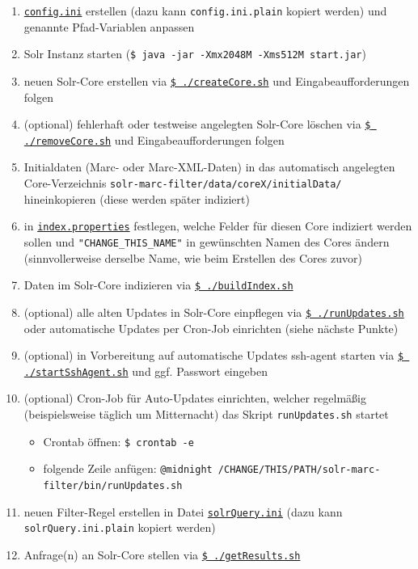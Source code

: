 \documentclass[10pt]{article}
\begin{document}
\begin{enumerate}
\begin{enumerate}
	\end{enumerate}
	\item \hyperref[sec:para:config.ini]{\texttt{config.ini}} erstellen (dazu kann \texttt{config.ini.plain} kopiert werden) und genannte Pfad-Variablen anpassen
	\item Solr Instanz starten (\texttt{\$ java -jar -Xmx2048M -Xms512M start.jar})
	\item neuen Solr-Core erstellen via \hyperref[sec:para:createCore]{\texttt{\$ ./createCore.sh}} und Eingabeaufforderungen folgen
	\item (optional) fehlerhaft oder testweise angelegten Solr-Core löschen via \hyperref[sec:para:removeCore]{\texttt{\$ ./removeCore.sh}} und Eingabeaufforderungen folgen
	\item Initialdaten (Marc- oder Marc-XML-Daten) in das automatisch angelegten Core-Verzeichnis \texttt{solr-marc-filter/data/coreX/initialData/} hineinkopieren (diese werden später indiziert)
	\item in \hyperref[para:index.properties]{\texttt{index.properties}} festlegen, welche Felder für diesen Core indiziert werden sollen und \texttt{"CHANGE\_THIS\_NAME"} in gewünschten Namen des Cores ändern (sinnvollerweise derselbe Name, wie beim Erstellen des Cores zuvor)
	\item Daten im Solr-Core indizieren via \hyperref[sec:para:buildIndex]{\texttt{\$ ./buildIndex.sh}}
	\item (optional) alle alten Updates in Solr-Core einpflegen via \hyperref[sec:para:runUpdates]{\texttt{\$ ./runUpdates.sh}} oder automatische Updates per Cron-Job einrichten (siehe nächste Punkte)
	\item (optional) in Vorbereitung auf automatische Updates ssh-agent starten via \hyperref[sec:para:startSshAgent]{\texttt{\$ ./startSshAgent.sh}} und ggf. Passwort eingeben
	\item (optional) Cron-Job für Auto-Updates einrichten, welcher regelmäßig (beispielsweise täglich um Mitternacht) das Skript \texttt{runUpdates.sh} startet
	\begin{itemize}
		\item Crontab öffnen: \texttt{\$ crontab -e}
		\item folgende Zeile anfügen: \texttt{@midnight /CHANGE/THIS/PATH/solr-marc-filter/bin/runUpdates.sh}
	\end{itemize}
	\item neuen Filter-Regel erstellen in Datei \hyperref[sec:para:runUpdates]{\texttt{solrQuery.ini}} (dazu kann \texttt{solrQuery.ini.plain} kopiert werden)
	\item Anfrage(n) an Solr-Core stellen via \hyperref[sec:para:getResults]{\texttt{\$ ./getResults.sh}}
	
\end{enumerate}
\end{document}
